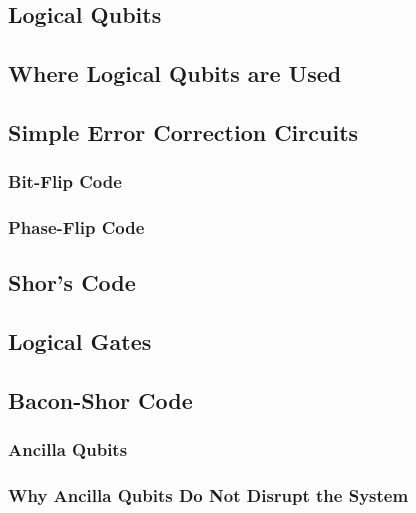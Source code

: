 \documentclass{article}
\begin{document}
\subsection{Logical Qubits}
\label{sec:logicalqubits}
\subsection{Where Logical Qubits are Used}
\label{sec:wherelqused}
\subsection{Simple Error Correction Circuits}
\label{sec:simpleeccircuits}
\subsubsection{Bit-Flip Code}
\label{sec:bitflipcode}
\subsubsection{Phase-Flip Code}
\label{sec:phaseflipcode}
\subsection{Shor's Code}
\label{sec:shorscode}
\subsection{Logical Gates}
\label{sec:logicalgates}
\subsection{Bacon-Shor Code}
\label{sec:baconshor}
\subsubsection{Ancilla Qubits}
\label{sec:ancillaqubits}
\subsubsection{Why Ancilla Qubits Do Not Disrupt the System}
\label{sec:ancilladisruption}
\end{document}
